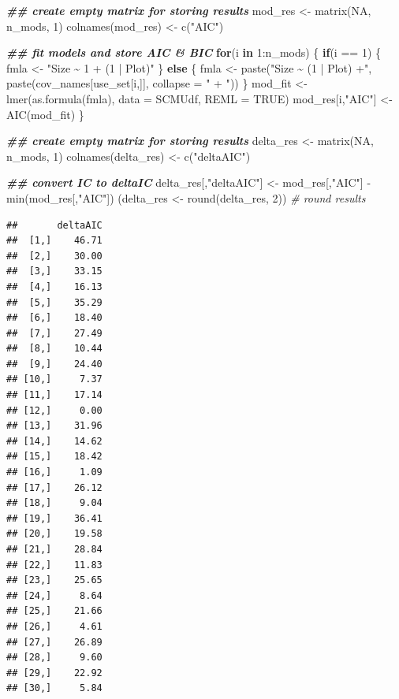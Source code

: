 \documentclass[
]{article}
\newenvironment{Shaded}{\begin{snugshade}}{\end{snugshade}}
\newcommand{\AttributeTok}[1]{\textcolor[rgb]{0.77,0.63,0.00}{#1}}
\newcommand{\CommentTok}[1]{\textcolor[rgb]{0.56,0.35,0.01}{\textit{#1}}}
\newcommand{\ConstantTok}[1]{\textcolor[rgb]{0.00,0.00,0.00}{#1}}
\newcommand{\ControlFlowTok}[1]{\textcolor[rgb]{0.13,0.29,0.53}{\textbf{#1}}}
\newcommand{\DecValTok}[1]{\textcolor[rgb]{0.00,0.00,0.81}{#1}}
\newcommand{\DocumentationTok}[1]{\textcolor[rgb]{0.56,0.35,0.01}{\textbf{\textit{#1}}}}
\newcommand{\FunctionTok}[1]{\textcolor[rgb]{0.00,0.00,0.00}{#1}}
\newcommand{\NormalTok}[1]{#1}
\newcommand{\OtherTok}[1]{\textcolor[rgb]{0.56,0.35,0.01}{#1}}
\newcommand{\SpecialCharTok}[1]{\textcolor[rgb]{0.00,0.00,0.00}{#1}}
\newcommand{\StringTok}[1]{\textcolor[rgb]{0.31,0.60,0.02}{#1}}
\begin{document}
\begin{Shaded}
\begin{Highlighting}[]
\DocumentationTok{\#\# create empty matrix for storing results}
\NormalTok{mod\_res }\OtherTok{\textless{}{-}} \FunctionTok{matrix}\NormalTok{(}\ConstantTok{NA}\NormalTok{, n\_mods, }\DecValTok{1}\NormalTok{)}
\FunctionTok{colnames}\NormalTok{(mod\_res) }\OtherTok{\textless{}{-}} \FunctionTok{c}\NormalTok{(}\StringTok{"AIC"}\NormalTok{)}

\DocumentationTok{\#\# fit models and store AIC \& BIC}
\ControlFlowTok{for}\NormalTok{(i }\ControlFlowTok{in} \DecValTok{1}\SpecialCharTok{:}\NormalTok{n\_mods) \{}
  \ControlFlowTok{if}\NormalTok{(i }\SpecialCharTok{==} \DecValTok{1}\NormalTok{) \{}
\NormalTok{    fmla }\OtherTok{\textless{}{-}} \StringTok{"Size \textasciitilde{} 1 + (1 | Plot)"}
\NormalTok{  \} }\ControlFlowTok{else}\NormalTok{ \{}
\NormalTok{    fmla }\OtherTok{\textless{}{-}} \FunctionTok{paste}\NormalTok{(}\StringTok{"Size \textasciitilde{} (1 | Plot) +"}\NormalTok{, }\FunctionTok{paste}\NormalTok{(cov\_names[use\_set[i,]], }\AttributeTok{collapse =} \StringTok{" + "}\NormalTok{))}
\NormalTok{  \}}
\NormalTok{  mod\_fit }\OtherTok{\textless{}{-}} \FunctionTok{lmer}\NormalTok{(}\FunctionTok{as.formula}\NormalTok{(fmla), }\AttributeTok{data =}\NormalTok{ SCMUdf, }\AttributeTok{REML =} \ConstantTok{TRUE}\NormalTok{)}
\NormalTok{  mod\_res[i,}\StringTok{"AIC"}\NormalTok{] }\OtherTok{\textless{}{-}} \FunctionTok{AIC}\NormalTok{(mod\_fit)}
\NormalTok{\}}

\DocumentationTok{\#\# create empty matrix for storing results}
\NormalTok{delta\_res }\OtherTok{\textless{}{-}} \FunctionTok{matrix}\NormalTok{(}\ConstantTok{NA}\NormalTok{, n\_mods, }\DecValTok{1}\NormalTok{)}
\FunctionTok{colnames}\NormalTok{(delta\_res) }\OtherTok{\textless{}{-}} \FunctionTok{c}\NormalTok{(}\StringTok{"deltaAIC"}\NormalTok{)}

\DocumentationTok{\#\# convert IC to deltaIC}
\NormalTok{delta\_res[,}\StringTok{"deltaAIC"}\NormalTok{] }\OtherTok{\textless{}{-}}\NormalTok{ mod\_res[,}\StringTok{"AIC"}\NormalTok{] }\SpecialCharTok{{-}} \FunctionTok{min}\NormalTok{(mod\_res[,}\StringTok{"AIC"}\NormalTok{])}
\NormalTok{(delta\_res }\OtherTok{\textless{}{-}} \FunctionTok{round}\NormalTok{(delta\_res, }\DecValTok{2}\NormalTok{)) }\CommentTok{\# round results}
\end{Highlighting}
\end{Shaded}

\begin{verbatim}
##       deltaAIC
##  [1,]    46.71
##  [2,]    30.00
##  [3,]    33.15
##  [4,]    16.13
##  [5,]    35.29
##  [6,]    18.40
##  [7,]    27.49
##  [8,]    10.44
##  [9,]    24.40
## [10,]     7.37
## [11,]    17.14
## [12,]     0.00
## [13,]    31.96
## [14,]    14.62
## [15,]    18.42
## [16,]     1.09
## [17,]    26.12
## [18,]     9.04
## [19,]    36.41
## [20,]    19.58
## [21,]    28.84
## [22,]    11.83
## [23,]    25.65
## [24,]     8.64
## [25,]    21.66
## [26,]     4.61
## [27,]    26.89
## [28,]     9.60
## [29,]    22.92
## [30,]     5.84
\end{verbatim}
\end{document}
